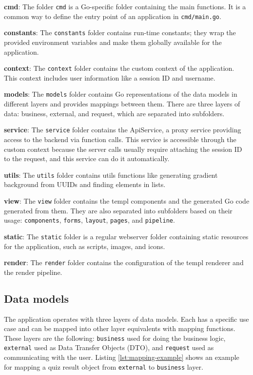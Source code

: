 \textbf{cmd}: The folder \texttt{cmd} is a Go-specific folder containing the main functions. It is a common way to define the entry point of an application in \texttt{cmd/main.go}.

\textbf{constants}: The \texttt{constants} folder contains run-time constants; they wrap the provided environment variables and make them globally available for the application.

\textbf{context}: The \texttt{context} folder contains the custom context of the application. This context includes user information like a session ID and username.

\textbf{models}: The \texttt{models} folder contains Go representations of the data models in different layers and provides mappings between them. There are three layers of data: business, external, and request, which are separated into subfolders.

\textbf{service}: The \texttt{service} folder contains the ApiService, a proxy service providing access to the backend via function calls. This service is accessible through the custom context because the server calls usually require attaching the session ID to the request, and this service can do it automatically.

\textbf{utils}: The \texttt{utils} folder contains utils functions like generating gradient background from UUIDs and finding elements in lists.

\textbf{view}: The \texttt{view} folder contains the templ components and the generated Go code generated from them. They are also separated into subfolders based on their usage: \texttt{components}, \texttt{forms}, \texttt{layout}, \texttt{pages}, and \texttt{pipeline}.

\textbf{static}: The \texttt{static} folder is a regular webserver folder containing static resources for the application, such as scripts, images, and icons.

\textbf{render}: The \texttt{render} folder contains the configuration of the templ renderer and the render pipeline.

\subsection{Data models}

The application operates with three layers of data models. Each has a specific use case and can be mapped into other layer equivalents with mapping functions. These layers are the following: \texttt{business} used for doing the business logic, \texttt{external} used as Data Transfer Objects (DTO), and \texttt{request} used as communicating with the user. Listing \ref{lst:mapping-example} shows an example for mapping a quiz result object from \texttt{external} to \texttt{business} layer.

